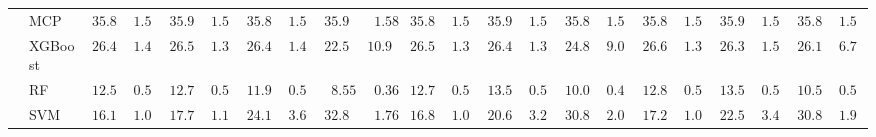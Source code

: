 \begin{tabular}{llllllllllllllllllllll}
	& MCP  & $35.89$ & $1.57$ & $35.90$ & $1.58$ & $35.89$ & $1.58$ & $35.90$ & $\phantom{0}1.58$ & $35.89$ & $1.57$ & $35.91$ & $1.58$ & $35.88$ & $1.58$ & $35.89$ & $1.57$ & $35.90$ & $1.57$ & $35.88$ & $1.56$ \\
	& XGBoost  & $26.42$ & $1.46$ & $26.50$ & $1.30$ & $26.47$ & $1.43$ & $22.57$ & $10.98$ & $26.52$ & $1.35$ & $26.43$ & $1.39$ & $24.88$ & $9.02$ & $26.62$ & $1.33$ & $26.37$ & $1.56$ & $26.19$ & $6.76$ \\
	& RF  & $12.54$ & $0.51$ & $12.79$ & $0.56$ & $11.97$ & $0.54$ & $\phantom{0}8.55$ & $\phantom{0}0.36$ & $12.75$ & $0.50$ & $13.53$ & $0.52$ & $10.04$ & $0.45$ & $12.83$ & $0.53$ & $13.57$ & $0.56$ & $10.55$ & $0.50$ \\
	& SVM  & $16.16$ & $1.04$ & $17.72$ & $1.11$ & $24.16$ & $3.62$ & $32.84$ & $\phantom{0}1.76$ & $16.81$ & $1.08$ & $20.60$ & $3.25$ & $30.84$ & $2.09$ & $17.26$ & $1.03$ & $22.55$ & $3.45$ & $30.80$ & $1.94$ \\
	\hline 
\end{tabular}